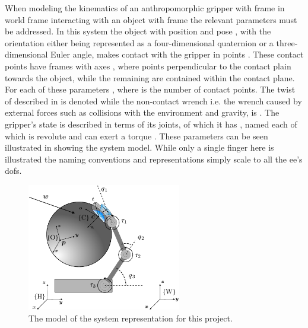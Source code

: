 When modeling the kinematics of an anthropomorphic gripper with frame  in world frame  interacting with an object with frame  the relevant parameters must be addressed. In this system the object with position  and pose , with the orientation either being represented as a four-dimensional quaternion or a three-dimensional Euler angle, makes contact with the gripper in points . These contact points have frames  with axes , where  points perpendicular to the contact plain towards the object, while the remaining are contained within the contact plane. For each of these parameters , where  is the number of contact points. The twist of  described in  is denoted  while the non-contact wrench i.e. the wrench caused by external forces such as collisions with the environment and gravity, is . The gripper's state is described in terms of its joints, of which it has , named  each of which is revolute and can exert a torque . These parameters can be seen illustrated in  showing the system model. While only a single finger here is illustrated the naming conventions and representations simply scale to all the \gls{ee}'s \gls{dof}s.
%
\begin{figure}[h]
	\begin{small}
		\begin{center}
			\includegraphics[width=0.6\textwidth]{chapters/modeling/fig/sys-schematic-reversed-crop.pdf}
		\end{center}
		\caption{The model of the system representation for this project.}
		\label{fig:sys-schematic}
	\end{small}
\end{figure}

